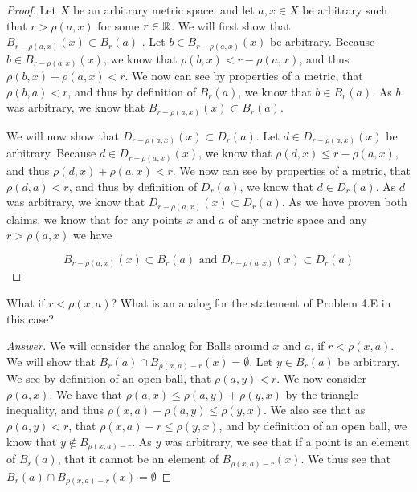 \begin{proof}
  Let $X$ be an arbitrary metric space, and let $a,x\in X$ be
  arbitrary such that $r
  > \rho(a,x)$ for some $r\in \mathbb{R}$.  We will first show that 
  $B_{r-\rho(a,x)}(x) \subset B_r(a)$ . Let $b \in B_{r-\rho(a,x)}(x)$
  be arbitrary. Because $b \in B_{r-\rho(a,x)}(x)$, we know that
  $\rho(b,x) < r- \rho(a,x)$, and thus   $\rho(b,x) + \rho(a,x)<
  r$. We now can see by properties of a metric, that $\rho(b,a)<r$,
  and thus by definition of $B_r(a)$, we know that $b \in B_r(a)$. As
  $b$ was arbitrary, we know that $B_{r-\rho(a,x)}(x) \subset B_r(a)$.

  We will now show that $D_{r-\rho(a,x)}(x) \subset D_r(a)$. Let $d 
  \in D_{r-\rho(a,x)}(x)$ be arbitrary. Because $d \in D_{r-\rho(a,x)}(x)$, we know that
  $\rho(d,x) \leq r- \rho(a,x)$, and thus   $\rho(d,x) + \rho(a,x)<
  r$. We now can see by properties of a metric, that $\rho(d,a)<r$,
  and thus by definition of $D_r(a)$, we know that $d \in D_r(a)$. As
  $d$ was arbitrary, we know that $D_{r-\rho(a,x)}(x) \subset
  D_r(a)$. As we have proven both claims, we know that for any points
  $x$ and $a$ of any metric space and any $r 
  > \rho(a,x)$ we have

  $$B_{r-\rho(a,x)}(x) \subset B_r(a) \text{  and  }
  D_{r-\rho(a,x)}(x) \subset D_r(a)$$
\end{proof}

\begin{minorEx}%
    What if $r < \rho(x,a)$? What is an analog for the statement of Problem 4.E
    in this case?
\end{minorEx}

\begin{proof}[Answer]
  We will consider the analog for Balls around $x$ and $a$, if $r<
  \rho(x,a)$. We will show that $B_r(a) \cap B_{\rho(x,a)-r}(x) =
  \emptyset$. Let $y\in B_{r}(a)$ be arbitrary. We see by
  definition of an open ball, that $\rho(a,y) < r$. 
  We now consider $\rho(a,x)$. We have that 
  $\rho(a,x) \leq \rho(a,y) + \rho(y,x)$ by the triangle inequality,
  and thus $\rho(x,a) - \rho(a,y) \leq\rho(y,x)$. We also see that as
  $\rho(a,y) < r$, that $\rho(x,a) - r \leq\rho(y,x)$, and by
  definition of an open ball, we know that $y \notin B_{\rho(x,a)-r}$.
  As $y$ was arbitrary, we see that if a point is an element of
  $B_r(a)$, that it cannot be an element of $B_{\rho(x,a)-r}(x)$. We
  thus see that $B_r(a) \cap B_{\rho(x,a)-r}(x) = \emptyset$
\end{proof}